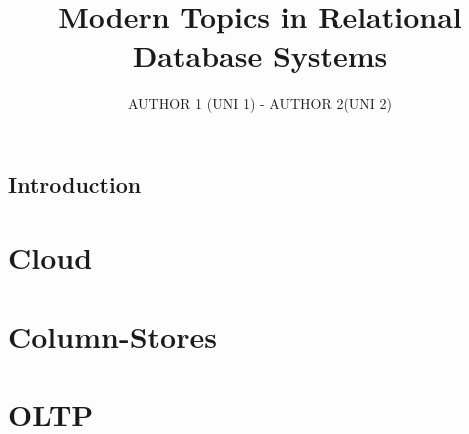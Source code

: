 \documentclass[11pt]{article}
\author{AUTHOR 1 (UNI 1) - AUTHOR 2(UNI 2)}
\title{Modern Topics in Relational Database Systems}
\begin{document}
\setlength{\parskip}{.1 in}

\maketitle
\newpage

\subsection*{Introduction}

%
%

\section*{Cloud}
 \newpage

\section*{Column-Stores}
 \newpage

\section*{OLTP}
 \newpage


\end{document}
